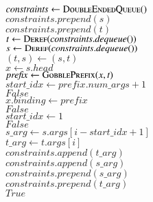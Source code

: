 \begin{quotex}
    \q $\mathit{constraints} \gets \textsc{DoubleEndedQueue}()$ \\
    \q $\mathit{constraints}.\mathit{prepend(s)}$ \\
    \q $\mathit{constraints}.\mathit{prepend(t)}$
    \\[\jot]
    \q {}
    \qq $t \gets \textsc{Deref}(\mathit{constraints}.\mathit{dequeue}())$ \\
    \qq $s \gets \textsc{Deref}(\mathit{constraints}.\mathit{dequeue}())$
    \\[\jot]
    \qq {}
    \qqq {}
    \qqqq $(t, s) \gets (s, t)$
    \\[\jot]
    \qqq {}
    \qqqq $x \gets s.\mathit{head}$ \\
    \qqqq $\mathit{prefix} \gets \textsc{GobblePrefix}(x,t)$ \\
    \qqqq {}
    \qqqqq $\mathit{start\_idx} \gets \mathit{prefix}.\mathit{num\_args} + 1$ \\
    \qqqqq {}
    \qqqqqq \MyReturn $\textit{False}$ \\
    \qqqqq \MyElse
    \qqqqqq $x.\mathit{binding} \gets \mathit{prefix}$ \\
    \qqqq \MyElse
    \qqqqq \MyReturn $\textit{False}$ \\
    \qqq {}
    \qqqq  $\mathit{start\_idx} \gets 1$ \\
    \qqq \MyElse
    \qqqq \MyReturn $\textit{False}$
    \\[\jot]
    \qqq {}
    \qqqq $\mathit{s\_arg} \gets s.\mathit{args}[i-\mathit{start\_idx}+1]$ \\
    \qqqq $\mathit{t\_arg} \gets t.\mathit{args}[i]$ \\
    \qqqq {}
    \qqqqq $\mathit{constraints}.\mathit{append}(t\_\mathit{arg})$ \\
    \qqqqq $\mathit{constraints}.\mathit{append}(s\_\mathit{arg})$ \\
    \qqqq \MyElse
    \qqqqq $\mathit{constraints}.\mathit{prepend}(s\_\mathit{arg})$ \\
    \qqqqq $\mathit{constraints}.\mathit{prepend}(t\_\mathit{arg})$
    \\[\jot]
    \q \MyReturn $\textit{True}$
    \end{quotex}

